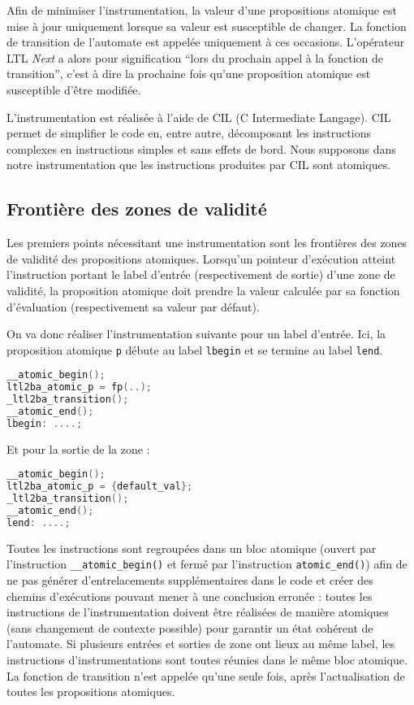 Afin de minimiser l'instrumentation, la valeur d'une propositions
atomique est mise à jour uniquement lorsque sa valeur est susceptible de
changer. La fonction de transition de l'automate est appelée uniquement
à ces occasions. L'opérateur LTL \emph{Next} a alors pour signification
``lors du prochain appel à la fonction de transition'', c'est à dire la
prochaine fois qu'une proposition atomique est susceptible d'être
modifiée.

L'instrumentation est réalisée à l'aide de CIL (C Intermediate Langage).
CIL permet de simplifier le code en, entre autre, décomposant les
instructions complexes en instructions simples et sans effets de bord.
Nous supposons dans notre instrumentation que les instructions produites
par CIL sont atomiques.

\subsection{Frontière des zones de validité}

Les premiers points nécessitant une instrumentation sont les frontières
des zones de validité des propositions atomiques. Lorsqu'un pointeur
d'exécution atteint l'instruction portant le label d'entrée
(respectivement de sortie) d'une zone de validité, la proposition
atomique doit prendre la valeur calculée par sa fonction d'évaluation
(respectivement sa valeur par défaut).

On va donc réaliser l'instrumentation suivante pour un label d'entrée.
Ici, la proposition atomique \lstinline!p! débute au label
\lstinline!lbegin! et se termine au label \lstinline!lend!.

\begin{lstlisting}[language=C]
__atomic_begin();
ltl2ba_atomic_p = fp(..);
_ltl2ba_transition();
__atomic_end();
lbegin: ....;
\end{lstlisting}

Et pour la sortie de la zone :

\begin{lstlisting}[language=C]
__atomic_begin();
ltl2ba_atomic_p = {default_val};
_ltl2ba_transition();
__atomic_end();
lend: ....;
\end{lstlisting}

Toutes les instructions sont regroupées dans un bloc atomique (ouvert
par l'instruction \lstinline!__atomic_begin()! et fermé par
l'instruction \lstinline!atomic_end()!) afin de ne pas générer
d'entrelacements supplémentaires dans le code et créer des chemins
d'exécutions pouvant mener à une conclusion erronée : toutes les
instructions de l'instrumentation doivent être réalisées de manière
atomiques (sans changement de contexte possible) pour garantir un état
cohérent de l'automate. Si plusieurs entrées et sorties de zone ont
lieux au même label, les instructions d'instrumentations sont toutes
réunies dans le même bloc atomique. La fonction de transition n'est
appelée qu'une seule fois, après l'actualisation de toutes les
propositions atomiques.

